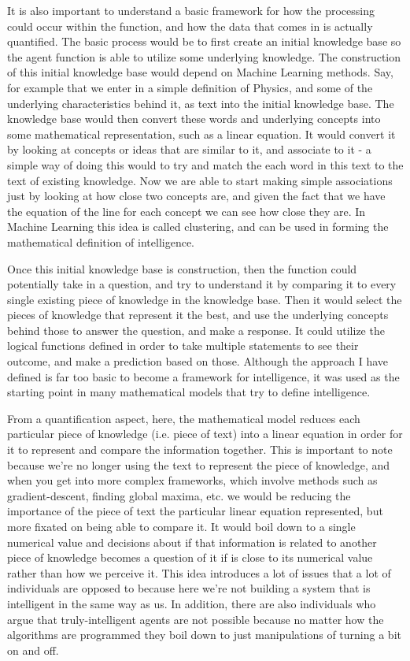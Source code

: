 \documentclass[11pt, oneside]{article}
\begin{document}
\par It is also important to understand a basic framework for how the processing could occur within the function, and how the data that comes in is actually quantified. The basic process would be to first create an initial knowledge base so the agent function is able to utilize some underlying knowledge. The construction of this initial knowledge base would depend on Machine Learning methods. Say, for example that we enter in a simple definition of Physics, and some of the underlying characteristics behind it, as text into the initial knowledge base. The knowledge base would then convert these words and underlying concepts into some mathematical representation, such as a linear equation. It would convert it by looking at concepts or ideas that are similar to it, and associate to it - a simple way of doing this would to try and match the each word in this text to the text of existing knowledge. Now we are able to start making simple associations just by looking at how close two concepts are, and given the fact that we have the equation of the line for each concept we can see how close they are. In Machine Learning this idea is called clustering, and can be used in forming the mathematical definition of intelligence. 

\par Once this initial knowledge base is construction, then the function could potentially take in a question, and try to understand it by comparing it to every single existing piece of knowledge in the knowledge base. Then it would select the pieces of knowledge that represent it the best, and use the underlying concepts behind those to answer the question, and make a response. It could utilize the logical functions defined in order to take multiple statements to see their outcome, and make a prediction based on those. Although the approach I have defined is far too basic to become a framework for intelligence, it was used as the starting point in many mathematical models that try to define intelligence. 

\par From a quantification aspect, here, the mathematical model reduces each particular piece of knowledge (i.e. piece of text) into a linear equation in order for it to represent and compare the information together. This is important to note because we're no longer using the text to represent the piece of knowledge, and when you get into more complex frameworks, which involve methods such as gradient-descent, finding global maxima, etc. we would be reducing the importance of the piece of text the particular linear equation represented, but more fixated on being able to compare it. It would boil down to a single numerical value and decisions about if that information is related to another piece of knowledge becomes a question of it if is close to its numerical value rather than how we perceive it. This idea introduces a lot of issues that a lot of individuals are opposed to because here we're not building a system that is intelligent in the same way as us. In addition, there are also individuals who argue that truly-intelligent agents are not possible because no matter how the algorithms are programmed they boil down to just manipulations of turning a bit on and off. 
\end{document}

